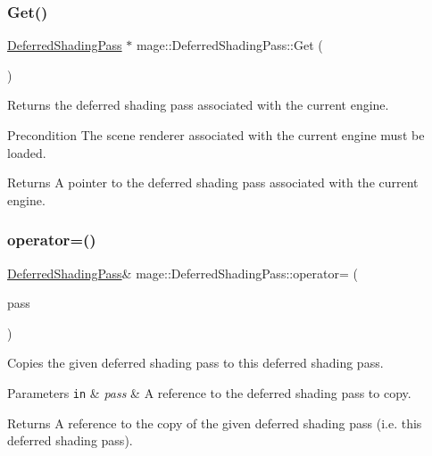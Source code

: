 \subsubsection{\texorpdfstring{Get()}{Get()}}
{\footnotesize\ttfamily \hyperlink{classmage_1_1_deferred_shading_pass}{Deferred\+Shading\+Pass} $\ast$ mage\+::\+Deferred\+Shading\+Pass\+::\+Get (\begin{DoxyParamCaption}{ }\end{DoxyParamCaption})\hspace{0.3cm}{\ttfamily [static]}}

Returns the deferred shading pass associated with the current engine.

\begin{DoxyPrecond}{Precondition}
The scene renderer associated with the current engine must be loaded. 
\end{DoxyPrecond}
\begin{DoxyReturn}{Returns}
A pointer to the deferred shading pass associated with the current engine. 
\end{DoxyReturn}
\hypertarget{classmage_1_1_deferred_shading_pass_ab9df64f241163f5f58ec2bf3d2b4a374}{}\label{classmage_1_1_deferred_shading_pass_ab9df64f241163f5f58ec2bf3d2b4a374} 
\subsubsection{\texorpdfstring{operator=()}{operator=()}\hspace{0.1cm}{\footnotesize\ttfamily [1/2]}}
{\footnotesize\ttfamily \hyperlink{classmage_1_1_deferred_shading_pass}{Deferred\+Shading\+Pass}\& mage\+::\+Deferred\+Shading\+Pass\+::operator= (\begin{DoxyParamCaption}\item[{const \hyperlink{classmage_1_1_deferred_shading_pass}{Deferred\+Shading\+Pass} \&}]{pass }\end{DoxyParamCaption})\hspace{0.3cm}{\ttfamily [delete]}}

Copies the given deferred shading pass to this deferred shading pass.


\begin{DoxyParams}[1]{Parameters}
\mbox{\tt in}  & {\em pass} & A reference to the deferred shading pass to copy. \\
\hline
\end{DoxyParams}
\begin{DoxyReturn}{Returns}
A reference to the copy of the given deferred shading pass (i.\+e. this deferred shading pass). 
\end{DoxyReturn}
\hypertarget{classmage_1_1_deferred_shading_pass_a19c925d46a7c8c4b436c9bbb161d6790}{}\label{classmage_1_1_deferred_shading_pass_a19c925d46a7c8c4b436c9bbb161d6790} 
